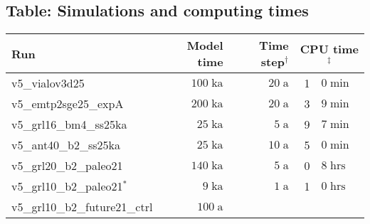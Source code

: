 \documentclass[12pt,a4paper]{article}
\begin{document}
\begin{appendix}
\section{Table: Simulations and computing times}
\label{sect_table}

\begin{table}[ht]
\centering
\begin{tabular}{lrrr@{.}l} \hline
Run & Model time & Time step$^\dagger$ 
                 & \multicolumn{2}{c}{CPU time$^\ddagger$} \\ \hline
v5\_vialov3d25                       &  $100\;\mathrm{ka}$\hspace*{1.0em}
                                     &   $20\;\mathrm{ a}$\hspace*{1.0em}
                                     &  1&$0\;\mathrm{min}$ \\
v5\_emtp2sge25\_expA                 &  $200\;\mathrm{ka}$\hspace*{1.0em}
                                     &   $20\;\mathrm{ a}$\hspace*{1.0em}
                                     &  3&$9\;\mathrm{min}$ \\
v5\_grl16\_bm4\_ss25ka               &   $25\;\mathrm{ka}$\hspace*{1.0em}
                                     &    $5\;\mathrm{ a}$\hspace*{1.0em}
                                     &  9&$7\;\mathrm{min}$ \\
v5\_ant40\_b2\_ss25ka                &   $25\;\mathrm{ka}$\hspace*{1.0em}
                                     &   $10\;\mathrm{ a}$\hspace*{1.0em}
                                     &  5&$0\;\mathrm{min}$ \\ \hline
v5\_grl20\_b2\_paleo21               &  $140\;\mathrm{ka}$\hspace*{1.0em}
                                     &    $5\;\mathrm{ a}$\hspace*{1.0em}
                                     &  0&$8\;\mathrm{hrs}$ \\
v5\_grl10\_b2\_paleo21$^\ast$        &    $9\;\mathrm{ka}$\hspace*{1.0em}
                                     &    $1\;\mathrm{ a}$\hspace*{1.0em}
                                     &  1&$0\;\mathrm{hrs}$ \\
v5\_grl10\_b2\_future21\_ctrl        &  $100\;\mathrm{ a}$\hspace*{1.47em}

\end{tabular}
\end{table}
\end{appendix}
\end{document}
